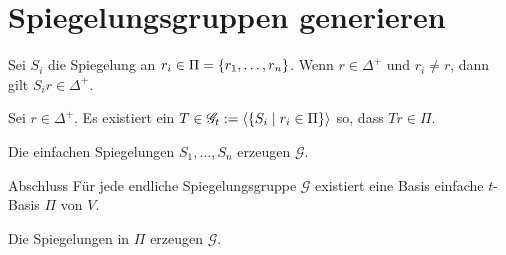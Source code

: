 \documentclass{beamer}
\begin{document}
\section{Spiegelungsgruppen generieren}
\begin{frame}
    \begin{satz} %
        Sei \( S_i \) die Spiegelung an 
        \( r_i \in \Pi = \{r_1, \ldots, r_n\} \).
        Wenn \( r \in \Delta^+ \) und \( r_i \neq r \), 
        dann gilt \( S_i r \in \Delta^+ \).
    \end{satz}
    \pause
    \begin{satz} %
        Sei \( r \in \Delta^+ \). Es existiert ein \( T \in 
        \mathscr{G}_t := \langle 
        \{S_i \;\vert\; r_i \in \Pi\} \rangle \) so, dass 
        \( Tr \in \Pi \).
    \end{satz}\pause
    \begin{satz} %
        Die einfachen Spiegelungen \( S_1, \ldots, S_n \) 
        erzeugen \( \mathscr{G} \).
    \end{satz}
\end{frame}

\begin{frame}{Abschluss}
    Für jede endliche Spiegelungsgruppe 
    \( \mathscr{G} \) existiert eine Basis 
    einfache \( t \)-Basis \( \Pi \) 
    von \( V \). 
    \pause
    
    Die Spiegelungen in 
    \( \Pi \) erzeugen \( \mathscr{G} \).
\end{frame}
\end{document}
